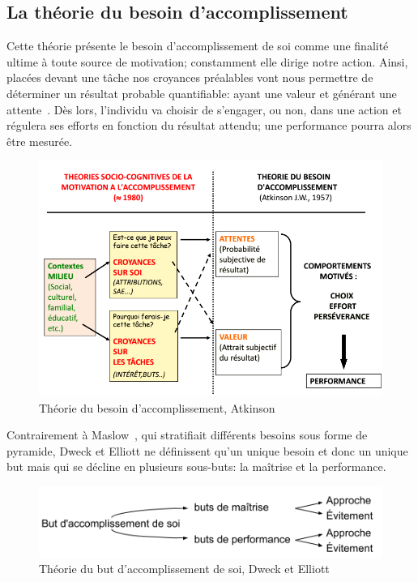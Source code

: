     \subsection{La théorie du besoin d’accomplissement}\label{sec:accomplissement}
        Cette théorie présente le besoin d'accomplissement de soi comme une finalité ultime à toute source de motivation; constamment elle dirige notre action. Ainsi, placées devant une tâche nos croyances préalables vont nous permettre de déterminer un résultat probable quantifiable: ayant une valeur et générant une attente~. Dès lors, l'individu va choisir de s'engager, ou non, dans une action et régulera ses efforts en fonction du résultat attendu; une performance pourra alors être mesurée.\par%
        \begin{figure}[!h]
            \centering
            \includegraphics[width=0.8\linewidth]{Figures/Atkinson-besoin_accomplissement.png}
            \caption{Théorie du besoin d’accomplissement, Atkinson~}
            \label{fig:atkinson}
        \end{figure}%
        Contrairement à Maslow~, qui stratifiait différents besoins sous forme de pyramide, Dweck et Elliott  ne définissent qu'un unique besoin et donc un unique but mais qui se décline en plusieurs sous-buts: la maîtrise et la performance.
        \begin{figure}[!h]
            \centering
            \includegraphics[width=0.9\linewidth]{Figures/Dweck-but_accomplissement.png}
            \caption{Théorie du but d’accomplissement de soi, Dweck et Elliott~}
            \label{fig:dweck}
        \end{figure}\par%

